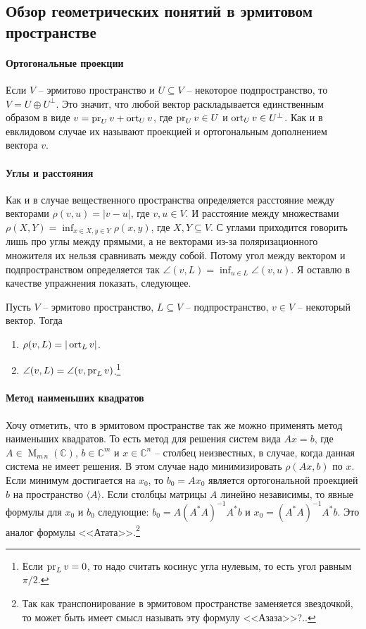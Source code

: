 \subsection{Обзор геометрических понятий в эрмитовом пространстве}

\paragraph{Ортогональные проекции}
Если $V$ -- эрмитово пространство и $U\subseteq V$ -- некоторое подпространство, то $V = U\oplus U^\bot$. Это значит, что любой вектор раскладывается единственным образом в виде $v = \operatorname{pr}_U v + \operatorname{ort}_U v$, где $\operatorname{pr}_U v\in U$ и $\operatorname{ort}_U v \in U^\bot$. Как и в евклидовом случае их называют проекцией и ортогональным дополнением вектора $v$.

\paragraph{Углы и расстояния}
Как и в случае вещественного пространства определяется расстояние между векторами $\rho(v,u) = |v - u|$, где $v,u\in V$. И расстояние между множествами $\rho(X, Y) = \inf_{x\in X, y\in Y}\rho(x,y)$, где $X,Y\subseteq V$. С углами приходится говорить лишь про углы между прямыми, а не векторами из-за поляризационного множителя их нельзя сравнивать между собой. Потому угол между вектором и подпространством определяется так $\angle(v,L) = \inf_{u\in L}\angle(v,u)$. Я оставлю в качестве упражнения показать, следующее.

\begin{claim}\label{claim::DistAngleHerm}
Пусть $V$ -- эрмитово пространство, $L\subseteq V$ -- подпространство, $v\in V$ -- некоторый вектор. Тогда
\begin{enumerate}
\item $\rho(v, L) = |\operatorname{ort}_L v|$.
\item $\angle(v, L) = \angle(v, \operatorname{pr}_L v)$.\footnote{Если $\operatorname{pr}_L v = 0$, то надо считать косинус угла нулевым, то есть угол равным $\pi/2$.}
\end{enumerate}
\end{claim}


\paragraph{Метод наименьших квадратов}
Хочу отметить, что в эрмитовом пространстве так же можно применять метод наименьших квадратов. То есть метод для решения систем вида $Ax = b$, где $A\in \operatorname{M}_{m\,n}(\mathbb C)$, $b\in \mathbb C^m$ и $x\in\mathbb C^n$ -- столбец неизвестных, в случае, когда данная система не имеет решения. В этом случае надо минимизировать $\rho(Ax, b)$ по $x$. Если минимум достигается на $x_0$, то $b_0 = Ax_0$ является ортогональной проекцией $b$ на пространство $\langle A \rangle$. Если столбцы матрицы $A$ линейно независимы, то явные формулы для $x_0$ и $b_0$ следующие: $b_0 = A(A^*A)^{-1}A^*b$ и $x_0 = (A^*A)^{-1}A^*b$. Это аналог формулы <<Атата>>.\footnote{Так как транспонирование в эрмитовом пространстве заменяется звездочкой, то может быть имеет смысл называть эту формулу <<Азаза>>?..}


